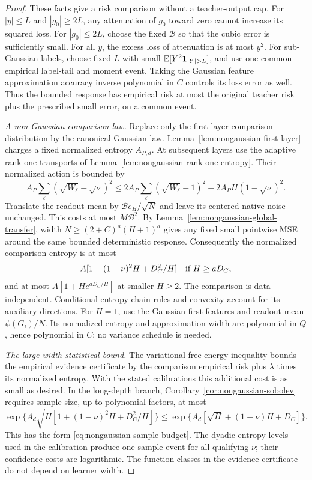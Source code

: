 \begin{proof}
These facts give a risk comparison without a teacher-output cap.
For $|y|\le L$ and $|g_0|\ge2L$, any attenuation of $g_0$ toward
zero cannot increase its squared loss. For $|g_0|\le2L$, choose the
fixed $\mathcal B$ so that the cubic error is sufficiently small.
For all $y$, the excess loss of attenuation is at most $y^2$.
For sub-Gaussian labels, choose fixed $L$ with small
$\E[Y^2\mathbf1_{|Y|>L}]$, and use one common empirical label-tail
and moment event. Taking the Gaussian feature approximation accuracy
inverse polynomial in $C$ controls its loss error as well. Thus the
bounded response has empirical risk at most the original teacher
risk plus the prescribed small error, on a common event.

\emph{A non-Gaussian comparison law.}
Replace only the first-layer comparison distribution by the canonical
Gaussian law. Lemma~\ref{lem:nongaussian-first-layer} charges a fixed
normalized entropy $A_{P,d}$. At subsequent layers use the adaptive
rank-one transports of Lemma~\ref{lem:nongaussian-rank-one-entropy}.
Their normalized action is bounded by
\[
 A_P\sum_\ell(\sqrt{W_\ell}-\sqrt\nu)^2
 \le 2A_P\sum_\ell(\sqrt{W_\ell}-1)^2
                   +2A_PH(1-\sqrt\nu)^2.
\]
Translate the readout mean by $\mathcal B e_H/\sqrt N$ and leave its
centered native noise unchanged. This costs at most $M\mathcal B^2$.
By Lemma~\ref{lem:nongaussian-global-transfer}, width
$N\ge(2+C)^a(H+1)^a$ gives any fixed small pointwise MSE around the
same bounded deterministic response. Consequently the normalized
comparison entropy is at most
\begin{equation}
 A[1+(1-\nu)^2H+D_C^2/H]
 \quad\hbox{if }H\ge aD_C,
 \label{eq:nongaussian-long-action}
\end{equation}
and at most $A[1+H e^{aD_C/H}]$ at smaller $H\ge2$.
The comparison is data-independent. Conditional entropy chain rules
and convexity account for its auxiliary directions.
For $H=1$, use the Gaussian first features and readout mean
$\psi(G_i)/N$. Its normalized entropy and approximation width are
polynomial in $Q$, hence polynomial in $C$; no variance schedule is
needed.

\emph{The large-width statistical bound.}
The variational free-energy inequality bounds the empirical evidence
certificate by the comparison empirical risk plus $\lambda$ times
its normalized entropy. With the stated calibrations this additional
cost is as small as desired. In the long-depth branch,
Corollary~\ref{cor:nongaussian-sobolev} requires sample size, up to
polynomial factors, at most
\[
 \exp\{A_d\sqrt{H[1+(1-\nu)^2H+D_C^2/H]}\}
 \le\exp\{A_d[\sqrt H+(1-\nu)H+D_C]\}.
\]
This has the form \eqref{eq:nongaussian-sample-budget}.
The dyadic entropy levels used in the calibration produce one sample
event for all qualifying $\nu$; their confidence costs are logarithmic.
The function classes in the evidence certificate do not depend on
learner width.


\end{proof}
